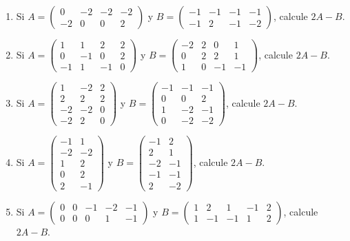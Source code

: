 \documentclass[12pt]{article}
\theoremstyle{remark}
\newcounter{contadorEjercicio}
\newenvironment{listaejercicios}{\begin{enumerate}[label=\textbf{E\arabic*.},leftmargin=2.4em,itemsep=0.52em]\setcounter{enumi}{\value{contadorEjercicio}}}{\setcounter{contadorEjercicio}{\value{enumi}}\end{enumerate}}
\begin{document}
\begin{listaejercicios}
\item Si $A=\begin{pmatrix}0&-2&-2&-2\\-2&0&0&2\end{pmatrix}$ y $B=\begin{pmatrix}-1&-1&-1&-1\\-1&2&-1&-2\end{pmatrix}$, calcule $2A-B$.

\item Si $A=\begin{pmatrix}1&1&2&2\\0&-1&0&2\\-1&1&-1&0\end{pmatrix}$ y $B=\begin{pmatrix}-2&2&0&1\\0&2&2&1\\1&0&-1&-1\end{pmatrix}$, calcule $2A-B$.

\item Si $A=\begin{pmatrix}1&-2&2\\2&2&2\\-2&-2&0\\-2&2&0\end{pmatrix}$ y $B=\begin{pmatrix}-1&-1&-1\\0&0&2\\1&-2&-1\\0&-2&-2\end{pmatrix}$, calcule $2A-B$.

\item Si $A=\begin{pmatrix}-1&1\\-2&-2\\1&2\\0&2\\2&-1\end{pmatrix}$ y $B=\begin{pmatrix}-1&2\\2&1\\-2&-1\\-1&-1\\2&-2\end{pmatrix}$, calcule $2A-B$.

\item Si $A=\begin{pmatrix}0&0&-1&-2&-1\\0&0&0&1&-1\end{pmatrix}$ y $B=\begin{pmatrix}1&2&1&-1&2\\1&-1&-1&1&2\end{pmatrix}$, calcule $2A-B$.


\end{listaejercicios}
\end{document}
